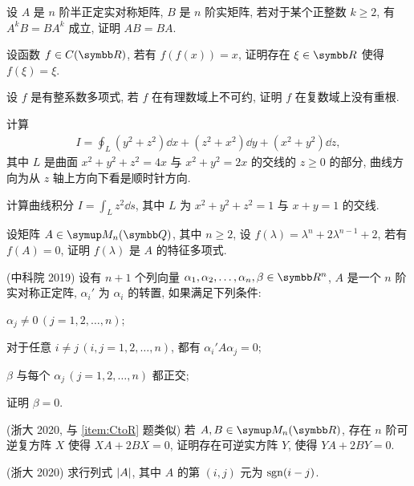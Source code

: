 \begin{exercise}[resume=exer]
\begin{answer}
        \end{answer}
        \item 设 $ A $ 是 $ n $ 阶半正定实对称矩阵, $ B $ 是 $ n $ 阶实矩阵, 若对于某个正整数 $ k \ge 2 $, 有 $ A^{k}B = BA^{k} $ 成立, 证明 $ AB = BA $. 
        \item 设函数 $ f \in C(\R) $, 若有 $ f(f(x)) = x $, 证明存在 $ \xi\in \R $ 使得 $ f(\xi) = \xi $.
        \item 设 $ f $ 是有整系数多项式, 若 $ f $ 在有理数域上不可约, 证明 $ f $ 在复数域上没有重根. 
        \item 计算 
        \begin{align*}
            I = \oint_{L} (y^{2} + z^{2}) \dd{x} + (z^{2} + x^{2}) \dd{y} + (x^{2} + y^{2}) \dd{z},
        \end{align*}
        其中 $ L $ 是曲面 $ x^{2} + y^{2} + z^{2} = 4x $ 与 $ x^{2} + y^{2} = 2x $ 的交线的 $ z \ge 0 $ 的部分, 曲线方向为从 $ z $ 轴上方向下看是顺时针方向.
        \item 计算曲线积分 $ I = \int_{L} z^{2} \dd{s} $, 其中 $ L $ 为 $ x^{2} + y^{2} + z^{2} = 1 $ 与 $ x + y = 1 $ 的交线.
        \item 设矩阵 $ A \in \MM[\Q] $, 其中 $ n\ge 2 $, 设 $ f(\lambda) = \lambda^{n} + 2\lambda^{n-1} + 2 $, 若有 $ f(A) = 0 $, 证明 $ f(\lambda) $ 是 $ A $ 的特征多项式.
        \item 
        \item (中科院 2019) 设有 $ n + 1 $ 个列向量 $ \alpha_{1}, \alpha_{2}, \dots, \alpha_{n}, \beta \in \R^{n} $, $ A $ 是一个 $ n $ 阶实对称正定阵, $ \alpha_{i}' $ 为 $ \alpha_{i} $ 的转置, 如果满足下列条件: 
        \begin{exercise}
            \item $ \alpha_{j} \ne 0\, (j = 1, 2, \dots, n) $;
            \item 对于任意 $ i \ne j \,(i, j = 1, 2, \dots, n) $, 都有 $ \alpha_{i}' A \alpha_{j} = 0 $;
            \item $ \beta $ 与每个 $ \alpha_{j}\,(j = 1, 2, \dots, n) $ 都正交; 
        \end{exercise}
        证明 $ \beta = 0 $.
        \item (浙大 2020, 与 \ref{item:CtoR} 题类似) 若 $ A, B \in \MM $, 存在 $ n $ 阶可逆复方阵 $ X $ 使得 $ XA + 2BX = 0 $, 证明存在可逆实方阵 $ Y $, 使得 $ YA + 2BY = 0 $. 
        \item (浙大 2020) 求行列式 $ \abs{A} $, 其中 $ A $ 的第 $ (i, j) $ 元为 $ \operatorname{sgn}(i - j) $.

\end{exercise}
